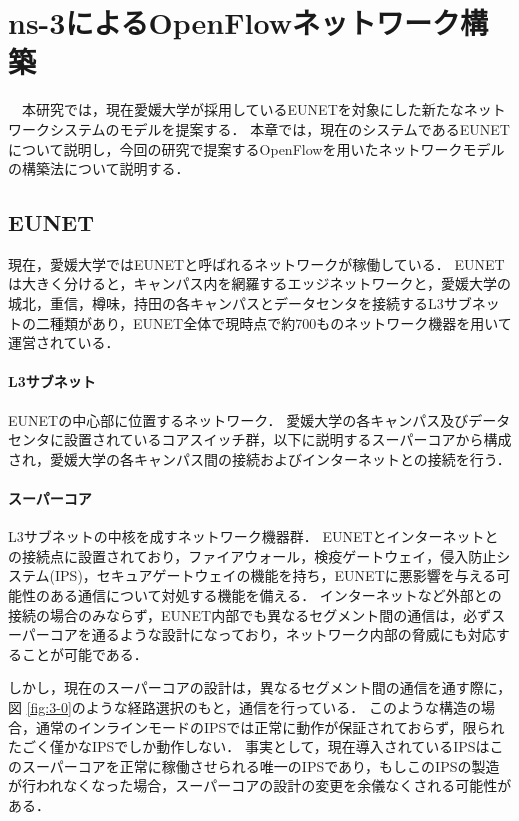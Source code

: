 \chapter{ns-3によるOpenFlowネットワーク構築}

　本研究では，現在愛媛大学が採用しているEUNETを対象にした新たなネットワークシステムのモデルを提案する．
本章では，現在のシステムであるEUNETについて説明し，今回の研究で提案するOpenFlowを用いたネットワークモデルの構築法について説明する．

\section{EUNET}

現在，愛媛大学ではEUNETと呼ばれるネットワークが稼働している．
EUNETは大きく分けると，キャンパス内を網羅するエッジネットワークと，愛媛大学の城北，重信，樽味，持田の各キャンパスとデータセンタを接続するL3サブネットの二種類があり，EUNET全体で現時点で約700ものネットワーク機器を用いて運営されている．

\subsubsection{L3サブネット}

EUNETの中心部に位置するネットワーク．
愛媛大学の各キャンパス及びデータセンタに設置されているコアスイッチ群，以下に説明するスーパーコアから構成され，愛媛大学の各キャンパス間の接続およびインターネットとの接続を行う．

\subsubsection{スーパーコア}

L3サブネットの中核を成すネットワーク機器群．
EUNETとインターネットとの接続点に設置されており，ファイアウォール，検疫ゲートウェイ，侵入防止システム(IPS)，セキュアゲートウェイの機能を持ち，EUNETに悪影響を与える可能性のある通信について対処する機能を備える．
インターネットなど外部との接続の場合のみならず，EUNET内部でも異なるセグメント間の通信は，必ずスーパーコアを通るような設計になっており，ネットワーク内部の脅威にも対応することが可能である．

しかし，現在のスーパーコアの設計は，異なるセグメント間の通信を通す際に，図 \ref{fig:3-0}のような経路選択のもと，通信を行っている．
このような構造の場合，通常のインラインモードのIPSでは正常に動作が保証されておらず，限られたごく僅かなIPSでしか動作しない．
事実として，現在導入されているIPSはこのスーパーコアを正常に稼働させられる唯一のIPSであり，もしこのIPSの製造が行われなくなった場合，スーパーコアの設計の変更を余儀なくされる可能性がある．

